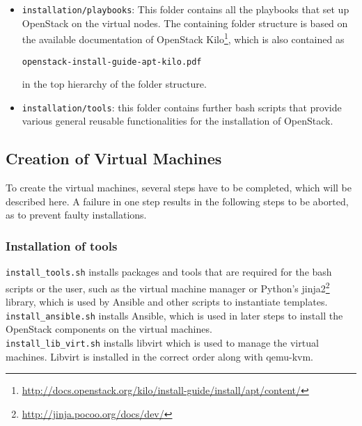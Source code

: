 \begin{appendix}
\begin{itemize}
	\begin{itemize}
		\item \verb|installation/playbooks|: This folder contains all the playbooks that set up OpenStack on the virtual nodes. The containing folder structure is based on the available documentation of OpenStack Kilo\footnote{\url{http://docs.openstack.org/kilo/install-guide/install/apt/content/}}, which is also contained as 
\begin{verbatim}
openstack-install-guide-apt-kilo.pdf
\end{verbatim}		
		in the top hierarchy of the folder structure.
	\end{itemize}
	
	\begin{itemize}
		\item \verb|installation/tools|: this folder contains further bash scripts that provide various general reusable functionalities for the installation of OpenStack.
	\end{itemize}
\end{itemize}




\subsection{Creation of Virtual Machines}
To create the virtual machines, several steps have to be completed, which will be described here. A failure in one step results in the following steps to be aborted, as to prevent faulty installations.


\subsubsection{Installation of tools}
\texttt{install\_tools.sh} installs packages and tools that are required for the bash scripts or the user, such as the virtual machine manager or Python's jinja2\footnote{\url{http://jinja.pocoo.org/docs/dev/}} library, which is used by Ansible and other scripts to instantiate templates.\\

\texttt{install\_ansible.sh} installs Ansible, which is used in later steps to install the OpenStack components on the virtual machines.\\

\texttt{install\_lib\_virt.sh} installs libvirt which is used to manage the virtual machines. Libvirt is installed in the correct order along with qemu-kvm.



\end{appendix}
